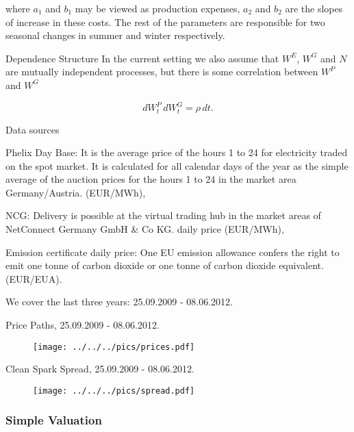 where $a_1$ and $b_1$ may be viewed as production expenses, $a_2$ and $b_2$ are the slopes of increase in these costs. The rest of the parameters are responsible for two seasonal changes in summer and winter respectively.

{Dependence Structure}
In the current setting we also assume that $W^E$, $W^G$ and $N$ are mutually independent processes, but there is some correlation between  $W^P$ and $W^G$

\begin{equation}
d{W}^P_t\,d{W}^G_t = \rho\,d{t}.
\label{corr}
\end{equation}

{Data sources}
\item Phelix Day Base: It is the average price of the hours 1 to 24 for electricity traded on the spot market.
It is calculated for all calendar days of the year as the simple average of the auction prices for the
hours 1 to 24 in the market area Germany/Austria. (EUR/MWh),
\item NCG: Delivery is possible at the virtual trading hub in the market areas of
NetConnect Germany GmbH \& Co KG. daily price (EUR/MWh),
\item Emission certificate daily price: One EU emission allowance confers the right to emit one tonne of carbon dioxide or one tonne of
carbon dioxide equivalent. (EUR/EUA).
\item We cover the last three years: 25.09.2009 - 08.06.2012.

{Price Paths, 25.09.2009 - 08.06.2012.}
\begin{figure}[htp]
\centering
\texttt{[image: ../../../pics/prices.pdf]}
\label{prices}
\end{figure}

{Clean Spark Spread, 25.09.2009 - 08.06.2012.}
\begin{figure}[htp]
\centering
\texttt{[image: ../../../pics/spread.pdf]}
\label{spread}
\end{figure}

\subsubsection{Simple Valuation}

